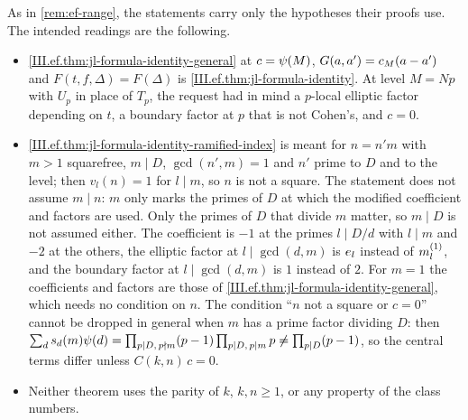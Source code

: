 \begin{remark}\label{rem:ef-general-range}
As in \cref{rem:ef-range}, the statements carry only the hypotheses their proofs use. The intended readings are the following.
\begin{itemize}
\item \cref{III.ef.thm:jl-formula-identity-general} at $c=\psi(M)$, $G(a,a')=c_M(a-a')$ and $F(t,f,\Delta)=F(\Delta)$ is
  \cref{III.ef.thm:jl-formula-identity}. At level $M=Np$ with $U_p$ in place of $T_p$, the request had in mind a $p$-local elliptic factor depending
  on $t$, a boundary factor at $p$ that is not Cohen's, and $c=0$.
\item \cref{III.ef.thm:jl-formula-identity-ramified-index} is meant for $n=n'm$ with $m>1$ squarefree, $m\mid D$, $\gcd(n',m)=1$ and $n'$ prime to
  $D$ and to the level; then $v_l(n)=1$ for $l\mid m$, so $n$ is not a square. The statement does not assume $m\mid n$: $m$ only marks the primes of
  $D$ at which the modified coefficient and factors are used. Only the primes of $D$ that divide $m$ matter, so $m\mid D$ is not assumed either. The coefficient
  is $-1$ at the primes $l\mid D/d$ with $l\mid m$ and $-2$ at the others, the elliptic factor at $l\mid\gcd(d,m)$ is $e_l$ instead of $m^{(1)}_l$,
  and the boundary factor at $l\mid\gcd(d,m)$ is $1$ instead of $2$. For $m=1$ the coefficients and factors are those of
  \cref{III.ef.thm:jl-formula-identity-general}, which needs no condition on $n$. The condition ``$n$ not a square or $c=0$'' cannot be dropped in general when
  $m$ has a prime factor dividing $D$: then $\sum_ds_d(m)\psi(d)=\prod_{p\mid D,\,p\nmid m}(p-1)\prod_{p\mid D,\,p\mid m}p\ne\prod_{p\mid D}(p-1)$, so the central terms differ unless $C(k,n)\,c=0$.
\item Neither theorem uses the parity of $k$, $k,n\ge1$, or any property of the class numbers.
\end{itemize}
\end{remark}

